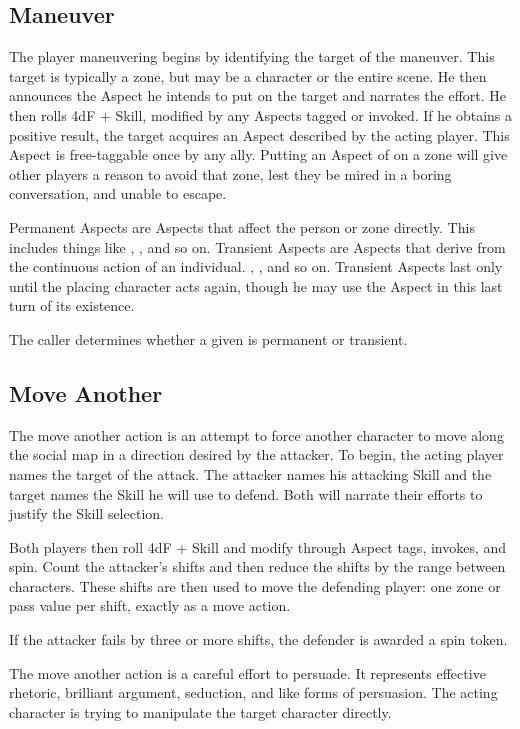 
\subsection{Maneuver}\label{sec:Maneuver}

The player maneuvering begins by identifying the target of the maneuver. This target is typically a zone, but may be a character or the entire scene. He then announces the Aspect he intends to put on  the target and narrates the effort. He then rolls 4dF + Skill, modified by any Aspects tagged or invoked. If he obtains a positive result, the target acquires an Aspect described by the acting player. This Aspect is free-taggable once by any ally. Putting an Aspect of  on a zone will give other players a reason to avoid that zone, lest they be mired in a boring conversation, and unable to escape.

Permanent Aspects are Aspects that affect the person or zone directly. This includes things like , , and so on. Transient Aspects are Aspects that derive from the continuous action of an individual. , , and so on. Transient Aspects last only until the placing character acts again, though he may use the Aspect in this last turn of its existence.

The caller determines whether a given \Aspect{} is permanent or transient.


\subsection{Move Another}\label{sec:Move Another}

The move another action is an attempt to force another character to move along the social map in a direction desired by the attacker. To begin, the acting player names the target of the attack. The attacker names his attacking Skill and the target names the Skill he will use to defend. Both will narrate their efforts to justify the Skill selection.

Both players then roll 4dF + Skill and modify through Aspect tags, invokes, and spin. Count the attacker's shifts and then reduce the shifts by the range between characters. These shifts are then used to move the defending player: one zone or pass value per shift, exactly as a move action.

If the attacker fails by three or more shifts, the defender is awarded a spin token.

The move another action is a careful effort to persuade. It represents effective rhetoric, brilliant argument, seduction, and like forms of persuasion. The acting character is trying to manipulate the target character directly.


